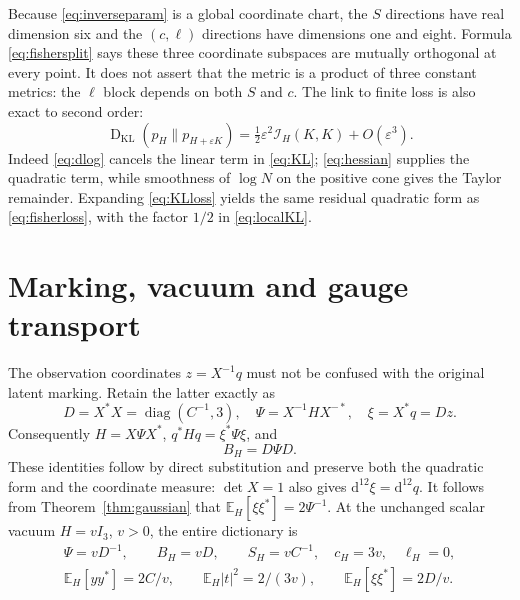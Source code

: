 \documentclass[11pt,a4paper]{article}
\numberwithin{equation}{section}
\theoremstyle{definition}
\theoremstyle{remark}
\newcommand{\diag}{\operatorname{diag}}
\newcommand{\KL}{\operatorname{D}_{\mathrm{KL}}}
\newcommand{\EE}{\mathbb E}
\newcommand{\FI}{\mathcal I}
\newcommand{\invstar}{^{-\!*}}
\begin{document}
Because \eqref{eq:inverseparam} is a global coordinate chart, the
$S$ directions have real dimension six and the $(c,\ell)$ directions
have dimensions one and eight. Formula \eqref{eq:fishersplit} says these
three coordinate subspaces are mutually orthogonal at every point.
It does not assert that the metric is a product of three constant
metrics: the $\ell$ block depends on both $S$ and $c$.
The link to finite loss is also exact to second order:
\begin{equation}\label{eq:localKL}
\KL(p_H\|p_{H+\varepsilon K})
=\tfrac12\varepsilon^2\FI_H(K,K)+O(\varepsilon^3).
\end{equation}
Indeed \eqref{eq:dlog} cancels the linear term in \eqref{eq:KL};
\eqref{eq:hessian} supplies the quadratic term, while smoothness of
$\log N$ on the positive cone gives the Taylor remainder. Expanding
\eqref{eq:KLloss} yields the same residual quadratic form as
\eqref{eq:fisherloss}, with the factor $1/2$ in \eqref{eq:localKL}.

\section{Marking, vacuum and gauge transport}\label{sec:gauge}

The observation coordinates $z=X^{-1}q$ must not be confused with the
original latent marking. Retain the latter exactly as
\begin{equation}\label{eq:marking}
D=X^*X=\diag(C^{-1},3),\quad
\Psi=X^{-1}HX\invstar,\quad
\xi=X^*q=Dz.
\end{equation}
Consequently $H=X\Psi X^*$, $q^*Hq=\xi^*\Psi\xi$, and
\begin{equation}\label{eq:Bpsi}
B_H=D\Psi D.
\end{equation}
These identities follow by direct substitution and preserve both the
quadratic form and the coordinate measure: $\det X=1$ also gives
$\mathrm d^{12}\xi=\mathrm d^{12}q$.
It follows from Theorem~\ref{thm:gaussian} that
$\EE_H[\xi\xi^*]=2\Psi^{-1}$.
At the unchanged scalar vacuum $H=vI_3$, $v>0$, the entire dictionary is
\begin{equation}\label{eq:vacuum}
\begin{gathered}
\Psi=vD^{-1},\qquad B_H=vD,\qquad
S_H=vC^{-1},\quad c_H=3v,\quad\ell_H=0,\\
\EE_H[yy^*]=2C/v,\qquad
\EE_H|t|^2=2/(3v),\qquad
\EE_H[\xi\xi^*]=2D/v.
\end{gathered}
\end{equation}
\end{document}

